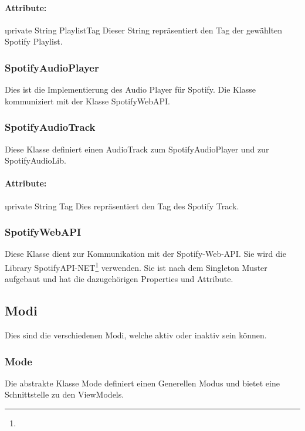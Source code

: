 \documentclass[../entwurf.tex]{subfiles}
\begin{document}
				\paragraph{Attribute:}
					\begin{itemize}
						\i{private String PlaylistTag} Dieser String repräsentiert den Tag der gewählten Spotify Playlist.
					\end{itemize}
			\subsubsection{SpotifyAudioPlayer}
				Dies ist die Implementierung des Audio Player für Spotify. Die Klasse kommuniziert mit der Klasse SpotifyWebAPI.
			\subsubsection{SpotifyAudioTrack}
				Diese Klasse definiert einen AudioTrack zum SpotifyAudioPlayer und zur SpotifyAudioLib.
				\paragraph{Attribute:}
					\begin{itemize}
						\i{private String Tag} Dies repräsentiert den Tag des Spotify Track.
					\end{itemize}
			\subsubsection{SpotifyWebAPI}
				Diese Klasse dient zur Kommunikation mit der Spotify-Web-API. Sie wird die Library 
				SpotifyAPI-NET\footnote{} verwenden.
				Sie ist nach dem Singleton Muster aufgebaut und hat die dazugehörigen Properties und Attribute.
		\subsection{Modi}
			Dies sind die verschiedenen Modi, welche aktiv oder inaktiv sein können.
			\subsubsection{Mode}
				Die abstrakte Klasse Mode definiert einen Generellen Modus und bietet eine Schnittstelle zu den ViewModels.
\end{document}
